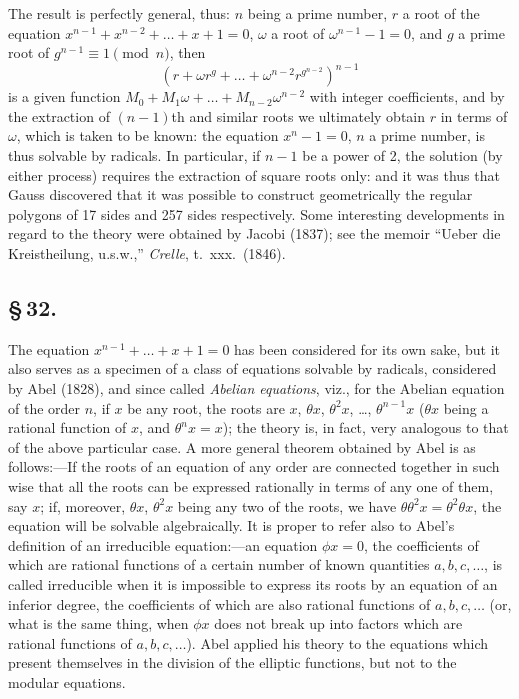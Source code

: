 \documentclass[11pt,a4paper]{book}
\begin{document}
The result is perfectly general, thus: $n$ being a prime number, $r$ a root of the equation $x^{n-1} + x^{n-2} + \ldots + x + 1 = 0$, $\omega$ a root of $\omega^{n-1} - 1 = 0$, and $g$ a prime root of $g^{n-1} \equiv 1 \pmod{n}$, then
\[
(r + \omega r^{g} + \ldots + \omega^{n-2}r^{g^{n-2}})^{n-1}
\]
is a given function $M_{0} + M_{1}\omega + \ldots + M_{n-2}\omega^{n-2}$ with integer coefficients, and by the extraction of $(n - 1)$th and similar roots we ultimately obtain $r$ in terms of $\omega$, which is taken to be known: the equation $x^{n} - 1 = 0$, $n$ a prime number, is thus solvable by radicals. In particular, if $n - 1$ be a power of 2, the solution (by either process) requires the extraction of square roots only: and it was thus that Gauss discovered that it was possible to construct geometrically the regular polygons of 17 sides and 257 sides respectively. Some interesting developments in regard to the theory were obtained by Jacobi (1837); see the memoir ``Ueber die Kreistheilung, u.s.w.,'' \textit{Crelle}, t.~xxx.\ (1846).

\subsection*{\S\,32.}

The equation $x^{n-1} + \ldots + x + 1 = 0$ has been considered for its own sake, but it also serves as a specimen of a class of equations solvable by radicals, considered by Abel (1828), and since called \textit{Abelian equations}, viz., for the Abelian equation of the order $n$, if $x$ be any root, the roots are $x$, $\theta x$, $\theta^{2}x$, \ldots, $\theta^{n-1}x$ ($\theta x$ being a rational function of $x$, and $\theta^{n}x = x$); the theory is, in fact, very analogous to that of the above particular case. A more general theorem obtained by Abel is as follows:---If the roots of an equation of any order are connected together in such wise that all the roots can be expressed rationally in terms of any one of them, say $x$; if, moreover, $\theta x$, $\theta^{2}x$ being any two of the roots, we have $\theta\theta^{2}x = \theta^{2}\theta x$, the equation will be solvable algebraically. It is proper to refer also to Abel's definition of an irreducible equation:---an equation $\phi x = 0$, the coefficients of which are rational functions of a certain number of known quantities $a, b, c, \ldots$, is called irreducible when it is impossible to express its roots by an equation of an inferior degree, the coefficients of which are also rational functions of $a, b, c, \ldots$ (or, what is the same thing, when $\phi x$ does not break up into factors which are rational functions of $a, b, c, \ldots$). Abel applied his theory to the equations which present themselves in the division of the elliptic functions, but not to the modular equations.
\end{document}
